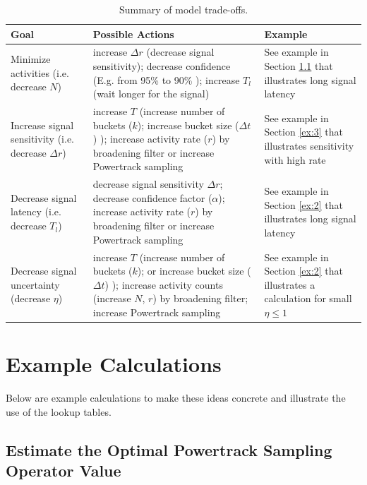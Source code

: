 \documentclass{article}
\begin{document}
\begin{table}[!h]
    \begin{tabular}{ p{3.0cm}| p{5.2cm} | p{2.6cm}}
     \hline
Goal  & Possible Actions & Example\\
\hline
Minimize activities (i.e. decrease $N$)  & increase $\Delta r$ (decrease signal sensitivity); decrease 
	confidence (E.g. from 95\% to 90\% ); increase $T_l$ (wait longer for the signal)  & See example 
	in Section \ref{ex:1} that illustrates long signal latency\\
\hline	
Increase signal sensitivity (i.e. decrease $\Delta r$) & increase $T$ (increase number of buckets ($k$); 
	increase bucket size ($\Delta t$) ); increase activity rate ($r$) by broadening filter or increase 
	Powertrack sampling  & See example in Section \ref{ex:3} that illustrates sensitivity with high rate\\
\hline
Decrease signal latency  (i.e. decrease $T_l$)   & decrease signal sensitivity $\Delta r$;
	decrease confidence factor ($\alpha$); increase activity rate ($r$) by broadening filter 
	or increase Powertrack sampling  & See example in Section \ref{ex:2} that illustrates long signal latency\\
\hline
Decrease signal uncertainty   (decrease $\eta$)  & increase $T$ (increase number of buckets ($k$); or 
	increase bucket size ($\Delta t$) ); increase activity counts (increase $N$, $r$) by broadening 
	filter; increase Powertrack sampling & See example in Section \ref{ex:2} that illustrates a calculation
	for small $\eta \le 1$\\
\hline
\end{tabular}
\caption{Summary of model trade-offs.}
\label{tab:tradeoff}

\end{table}

\section{Example Calculations} 

Below are example calculations to make these ideas concrete and illustrate the use of the lookup tables.

\subsection{Estimate the Optimal Powertrack Sampling Operator Value} 
\label{ex:1}
\end{document}
